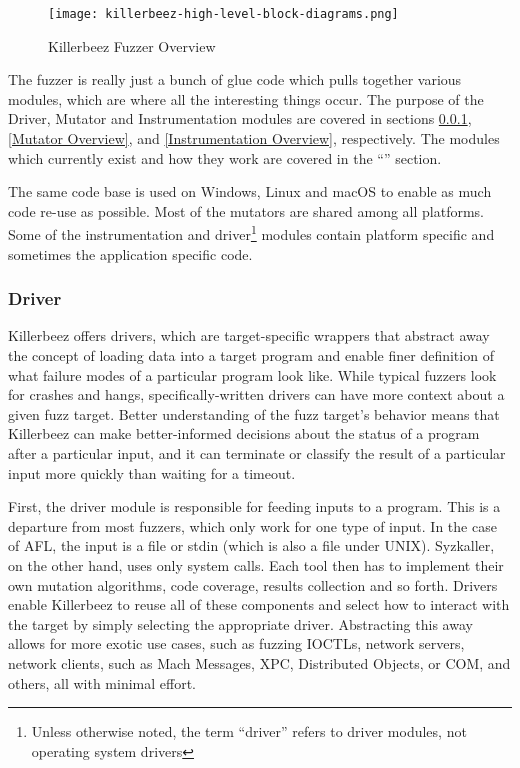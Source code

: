 \begin{figure*}[htb]
\centering
\texttt{[image: killerbeez-high-level-block-diagrams.png]}
\caption{Killerbeez Fuzzer Overview}
\label{fig:Killerbeez-fuzzer-overview}
\end{figure*}

The fuzzer is really just a bunch of glue code which pulls together various
modules, which are where all the interesting things occur. The purpose of
the Driver, Mutator and Instrumentation modules are covered in sections
\ref{Driver Overview}, \ref{Mutator Overview}, and
\ref{Instrumentation Overview}, respectively.  The modules which currently
exist and how they work are covered in the ``''
section.

The same code base is used on Windows, Linux and macOS to enable as much code
re-use as possible.  Most of the mutators are shared among all platforms.
Some of the instrumentation and driver\footnote{Unless otherwise noted,
the term ``driver'' refers to driver modules, not operating system drivers}
modules contain platform specific and sometimes the application specific code.

\subsubsection{Driver} \label{Driver Overview}
Killerbeez offers drivers, which are target-specific wrappers that abstract
away the concept of loading data into a target program and enable finer
definition of what failure modes of a particular program look like. While
typical fuzzers look for crashes and hangs, specifically-written drivers can
have more context about a given fuzz target.  Better understanding of the fuzz
target's behavior means that Killerbeez can make better-informed decisions
about the status of a program after a particular input, and it can terminate or
classify the result of a particular input more quickly than waiting for a
timeout.

First, the driver module is responsible for feeding inputs to a program.  This
is a departure from most fuzzers, which only work for one type of input.  In
the case of AFL, the input is a file or stdin (which is also a file under
UNIX).  Syzkaller\cite{syzkaller}, on the other hand, uses only system calls.
Each tool then has to implement their own mutation algorithms, code coverage,
results collection and so forth. Drivers enable Killerbeez to reuse all of
these components and select how to interact with the target by simply selecting
the appropriate driver.  Abstracting this away allows for more exotic use
cases, such as fuzzing IOCTLs, network servers, network clients, \IPC{} such as
Mach Messages, XPC, Distributed Objects, or COM, and others, all with minimal
effort.

